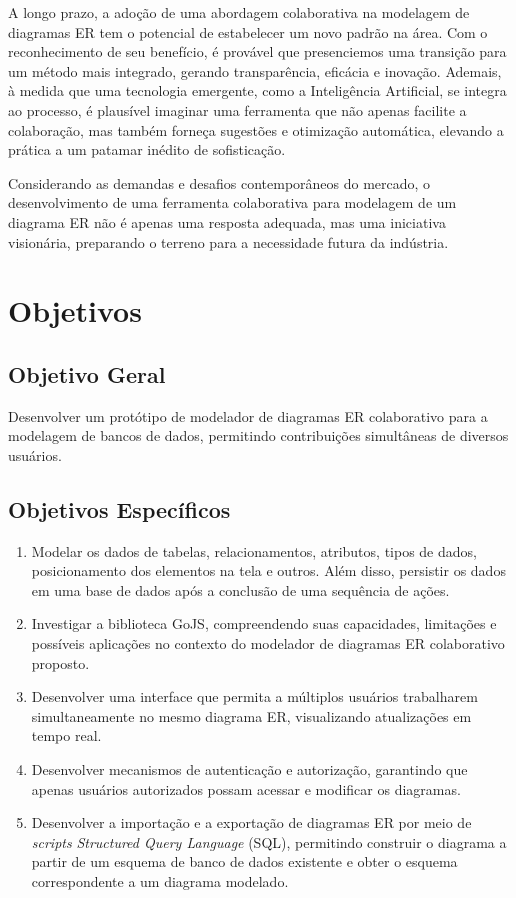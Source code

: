 A longo prazo, a adoção de uma abordagem colaborativa na modelagem de diagramas ER tem o potencial de estabelecer um novo padrão na área. Com o reconhecimento de seu benefício, é provável que presenciemos uma transição para um método mais integrado, gerando transparência, eficácia e inovação. Ademais, à medida que uma tecnologia emergente, como a Inteligência Artificial, se integra ao processo, é plausível imaginar uma ferramenta que não apenas facilite a colaboração, mas também forneça sugestões e otimização automática, elevando a prática a um patamar inédito de sofisticação.

Considerando as demandas e desafios contemporâneos do mercado, o desenvolvimento de uma ferramenta colaborativa para modelagem de um diagrama ER não é apenas uma resposta adequada, mas uma iniciativa visionária, preparando o terreno para a necessidade futura da indústria.
	
%
%
\section{Objetivos}

\subsection{Objetivo Geral}

Desenvolver um protótipo de modelador de diagramas ER colaborativo para a modelagem de bancos de dados, permitindo contribuições simultâneas de diversos usuários.

\subsection{Objetivos Específicos}	

\begin{enumerate}
    \item Modelar os dados de tabelas, relacionamentos, atributos, tipos de dados, posicionamento dos elementos na tela e outros. Além disso, persistir os dados em uma base de dados após a conclusão de uma sequência de ações.
    \item Investigar a biblioteca GoJS, compreendendo suas capacidades, limitações e possíveis aplicações no contexto do modelador de diagramas ER colaborativo proposto.
    \item Desenvolver uma interface que permita a múltiplos usuários trabalharem simultaneamente no mesmo diagrama ER, visualizando atualizações em tempo real.
    \item Desenvolver mecanismos de autenticação e autorização, garantindo que apenas usuários autorizados possam acessar e modificar os diagramas.
    \item Desenvolver a importação e a exportação de diagramas ER por meio de \textit{scripts} \textit{Structured Query Language} (SQL), permitindo construir o diagrama a partir de um esquema de banco de dados existente e obter o esquema correspondente a um diagrama modelado.
\end{enumerate}
